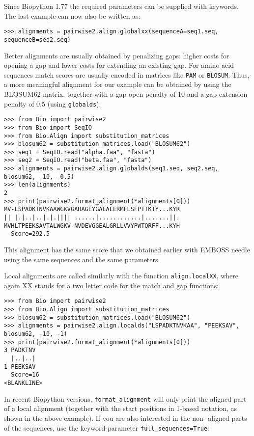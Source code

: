 Since Biopython 1.77 the required parameters can be supplied with keywords. The
last example can now also be written as:

\begin{verbatim}
>>> alignments = pairwise2.align.globalxx(sequenceA=seq1.seq, sequenceB=seq2.seq)
\end{verbatim}

Better alignments are usually obtained by penalizing gaps: higher costs
for opening a gap and lower costs for extending an existing gap. For amino
acid sequences match scores are usually encoded in matrices like \texttt{PAM}
or \texttt{BLOSUM}. Thus, a more meaningful alignment for our example can be
obtained by using the BLOSUM62 matrix, together with a gap open penalty of 10
and a gap extension penalty of 0.5 (using \verb|globalds|):

\begin{verbatim}
>>> from Bio import pairwise2
>>> from Bio import SeqIO
>>> from Bio.Align import substitution_matrices
>>> blosum62 = substitution_matrices.load("BLOSUM62")
>>> seq1 = SeqIO.read("alpha.faa", "fasta")
>>> seq2 = SeqIO.read("beta.faa", "fasta")
>>> alignments = pairwise2.align.globalds(seq1.seq, seq2.seq, blosum62, -10, -0.5)
>>> len(alignments)
2
>>> print(pairwise2.format_alignment(*alignments[0]))
MV-LSPADKTNVKAAWGKVGAHAGEYGAEALERMFLSFPTTKTY...KYR
|| |.|..|..|.|.|||| ......|............|.......||.
MVHLTPEEKSAVTALWGKV-NVDEVGGEALGRLLVVYPWTQRFF...KYH
  Score=292.5

\end{verbatim}

This alignment has the same score that we obtained earlier with EMBOSS needle
using the same sequences and the same parameters.

Local alignments are called similarly with the function \verb|align.localXX|,
where again XX stands for a two letter code for the match and gap functions:

\begin{verbatim}
>>> from Bio import pairwise2
>>> from Bio.Align import substitution_matrices
>>> blosum62 = substitution_matrices.load("BLOSUM62")
>>> alignments = pairwise2.align.localds("LSPADKTNVKAA", "PEEKSAV", blosum62, -10, -1)
>>> print(pairwise2.format_alignment(*alignments[0]))
3 PADKTNV
  |..|..|
1 PEEKSAV
  Score=16
<BLANKLINE>
\end{verbatim}

In recent Biopython versions, \verb|format_alignment| will only print the 
aligned part of a local alignment (together with the start positions in 1-based
notation, as shown in the above example). If you are also interested in the non-
aligned parts of the sequences, use the keyword-parameter \verb|full_sequences=True|:

